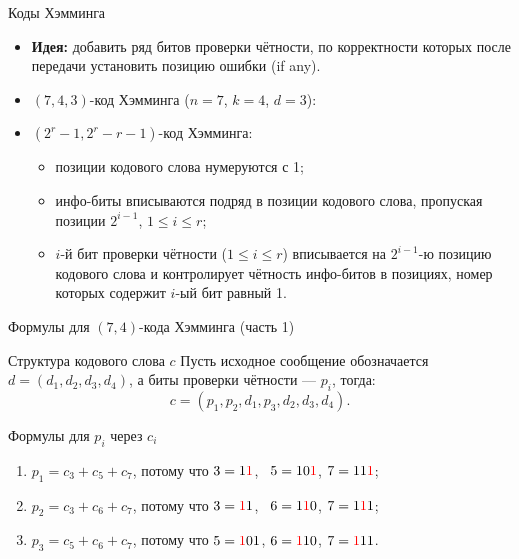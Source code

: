 \begin{frame}{Коды Хэмминга}
\begin{itemize}[<+->]

    \item \textbf{Идея:} добавить ряд битов проверки чётности, по
        корректности
        которых после передачи установить позицию ошибки (if any).

    \item
            $(7, 4, 3)$-код Хэмминга ($n = 7$, $k = 4$, $d=3$):


    \item $(2^r - 1, 2^r - r - 1)$-код Хэмминга: \\
    \begin{itemize}
        \item позиции кодового слова нумеруются с 1;

        \item инфо-биты вписываются подряд в позиции
            кодового слова, пропуская позиции $2^{i-1}$, $1 \leqslant i \leqslant r$;

        \item $i$-й бит проверки чётности ($1 \leqslant i \leqslant r$)
            вписывается на $2^{i-1}$-ю
            позицию кодового слова и контролирует чётность инфо-битов
            в позициях, номер которых содержит $i$-ый бит равный 1.
    \end{itemize}
\end{itemize}
\end{frame}

\begin{frame}{Формулы для $(7,4)$-кода Хэмминга (часть 1)}

\begin{block}{Структура кодового слова $c$}
Пусть исходное сообщение обозначается $d=(d_1, d_2, d_3, d_4)$, а биты проверки чётности — $p_i$, тогда:
\[
    c = (p_1, p_2, d_1, p_3, d_2, d_3, d_4).
\]
\end{block}

\begin{block}{Формулы для $p_i$ через $c_i$}
\begin{enumerate}
    \item $p_1 = c_3 + c_5 + c_7$,
        потому что $3 = 1 \color{red} 1$, \ $5 = 1 0 \color{red} 1$,
            $7 = 1 1 \color{red} 1$;
    \item $p_2 = c_3 + c_6 + c_7 $,
        потому что $3 = \textcolor{red}{1} 1$, \ $6 = 1\textcolor{red}{1}0$,
            $7 = 1\textcolor{red}{1}1$;
    \item $p_3 = c_5 + c_6 + c_7 $,
        потому что $5 = \textcolor{red}{1} 01$, $6 = \textcolor{red}{1}10$,
            $7 = \textcolor{red}{1}11$.
\end{enumerate}
\end{block}
\end{frame}

